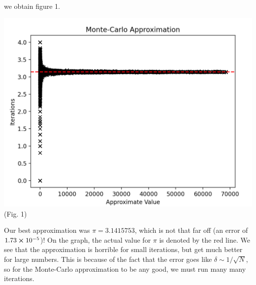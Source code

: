 \documentclass{article}
\begin{document}
we obtain figure 1.
\begin{center}
    \includegraphics[scale=0.43]{monteCarlo.png}\\
    (Fig. 1)
\end{center}
Our best approximation was $\pi=3.1415753$, which is not that far off (an error of $1.73\cross10^{-5}$)! On the graph, 
the actual value for $\pi$ is denoted by the red line. 
We see that the approximation is horrible for small iterations, 
but get much better for large numbers. 
This is because of the fact that the error goes like $\delta\sim1/\sqrt{N}$, so 
for the Monte-Carlo approximation to be any good, we must run many many iterations. 
\end{document}
